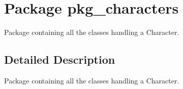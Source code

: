 \hypertarget{namespacepkg__characters}{\section{Package pkg\-\_\-characters}
\label{namespacepkg__characters}
}


Package containing all the classes handling a Character.  




\subsection{Detailed Description}
Package containing all the classes handling a Character. 